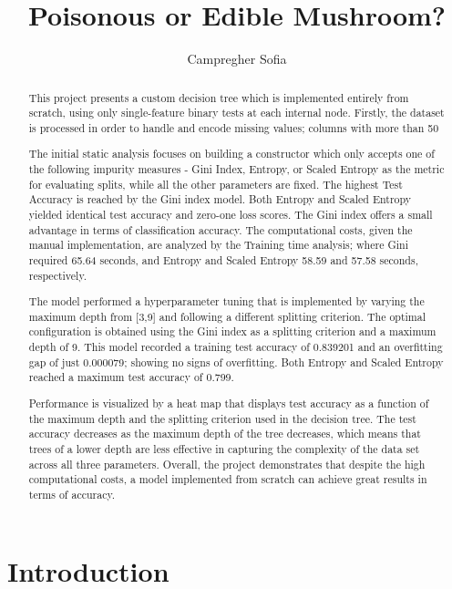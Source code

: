 \documentclass{article}
\title{Poisonous or Edible Mushroom?}
\author{Campregher Sofia}
\begin{document}
\maketitle


\begin{abstract}
This project presents a custom decision tree which is implemented entirely from scratch, using only single-feature binary tests at each internal node. 
Firstly, the dataset is processed in order to handle and encode missing values; columns with more than 50%

The initial static analysis focuses on building a constructor which only accepts one of the following impurity measures - Gini Index, Entropy, or Scaled Entropy as the metric for evaluating splits, while all the other parameters are fixed. The highest Test Accuracy is reached by the Gini index model. Both Entropy and Scaled Entropy yielded identical test accuracy and zero-one loss scores.
The Gini index offers a small advantage in terms of classification accuracy.
The computational costs, given the manual implementation, are analyzed by the Training time analysis; where Gini required 65.64 seconds, and Entropy and Scaled Entropy 58.59 and 57.58 seconds, respectively.

The model performed a hyperparameter tuning that is implemented by varying the maximum depth from [3,9] and following a different splitting criterion. The optimal configuration is obtained using the Gini index as a splitting criterion and a maximum depth of 9. This model recorded a training test accuracy of 0.839201 and an overfitting gap of just 0.000079; showing no signs of overfitting. Both Entropy and Scaled Entropy reached a maximum test accuracy of 0.799.

Performance is visualized by a heat map that displays test accuracy as a function of the maximum depth and the splitting criterion used in the decision tree. The test accuracy decreases as the maximum depth of the tree decreases, which means that trees of a lower depth are less effective in capturing the complexity of the data set across all three parameters. Overall, the project demonstrates that despite the high computational costs, a model implemented from scratch can achieve great results in terms of accuracy.
\end{abstract}

\section{Introduction}
\end{document}
